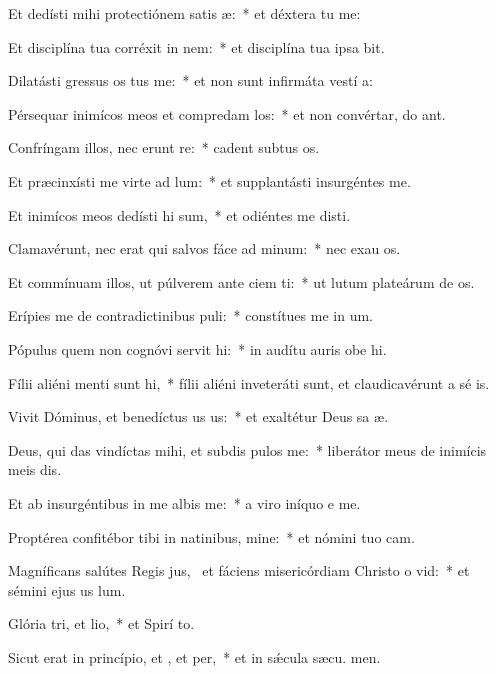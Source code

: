 \item Et dedísti mihi protectiónem satis æ:~* et déxtera tu  me:
\item Et disciplína tua corréxit  in nem:~* et disciplína tua ipsa  bit.
\item Dilatásti gressus os tus me:~* et non sunt infirmáta vestí a:
\item Pérsequar inimícos meos et compredam los:~* et non convértar, do ant.
\item Confríngam illos, nec erunt re:~* cadent subtus  os.
\item Et præcinxísti me virte ad lum:~* et supplantásti insurgéntes    me.
\item Et inimícos meos dedísti hi sum,~* et odiéntes me disti.
\item Clamavérunt, nec erat qui salvos fáce ad minum:~* nec exau os.
\item Et commínuam illos, ut púlverem ante ciem ti:~* ut lutum plateárum de os.
\item Erípies me de contradictinibus puli:~* constítues me in  um.
\item Pópulus quem non cognóvi servit hi:~* in audítu auris obe hi.
\item Fílii aliéni menti sunt hi,~* fílii aliéni inveteráti sunt, et claudicavérunt a sé is.
\item Vivit Dóminus, et benedíctus us us:~* et exaltétur Deus sa æ.
\item Deus, qui das vindíctas mihi, et subdis pulos  me:~* liberátor meus de inimícis meis dis.
\item Et ab insurgéntibus in me albis me:~* a viro iníquo e me.
\item Proptérea confitébor tibi in natinibus, mine:~* et nómini tuo  cam.
\item Magníficans salútes Regis jus,~\pscross{} et fáciens misericórdiam Christo o vid:~* et sémini ejus us  lum.
\item Glória tri, et lio,~* et Spirí to.
\item Sicut erat in princípio, et , et per,~* et in sǽcula sæcu. men.
